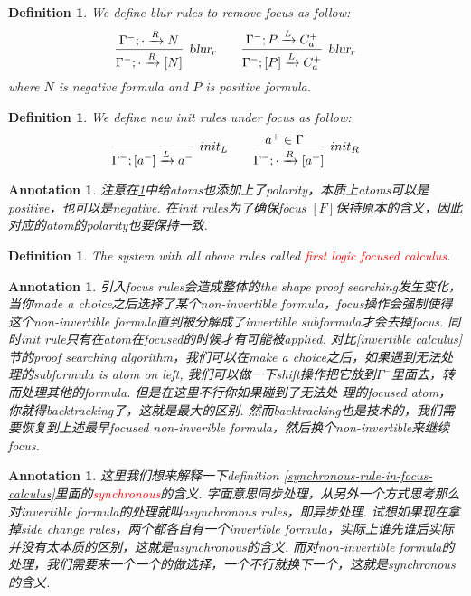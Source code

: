 \documentclass{article}
\theoremstyle{plain}
\newtheorem{definition}[theorem]{Definition}
\newtheorem{annotation}[theorem]{Annotation}
\theoremstyle{nonumberplain}
\newcommand{\redt}[1]{\textcolor{red}{#1}}
\begin{document}
\begin{definition}
\rm We define \textsl{blur} rules to remove focus as follow:
\[
\infer[\textsl{blur}_r]{\Gamma^-;\cdot \xrightarrow{R} [N]}{\Gamma^-;\cdot \xrightarrow{R} N} \quad\quad 
\infer[\textsl{blur}_r]{\Gamma^-;[P] \xrightarrow{L} C_a^+}{\Gamma^-; P \xrightarrow{L} C_a^+}
\]
where $N$ is negative formula and $P$ is positive formula.
\end{definition}

\begin{definition}\label{init-of-invertible-calculus}
\rm We define new \emph{init} rules under focus as follow: 
\[
\infer[init_L]{\Gamma^-;[a^-] \xrightarrow{L} a^-}{} \quad\quad
\infer[init_R]{\Gamma^-; \cdot \xrightarrow{R} [a^+]}{a^+ \in \Gamma^-}
\]
\end{definition}

\begin{annotation}
\rm 注意在\ref{init-of-invertible-calculus}中给atoms也添加上了polarity，本质上atoms可以是positive，也可以是negative. 在\emph{init} rules为了确保focus $[F]$保持原本的含义，因此对应的atom的polarity也要保持一致. 	
\end{annotation}


\begin{definition}
\rm The system with all above rules called \redt{first logic focused calculus}.
\end{definition}


\begin{annotation}
\rm 引入\textsl{focus} rules会造成整体的the shape proof searching发生变化，当你made a choice之后选择了某个non-invertible formula，focus操作会强制使得这个non-invertible formula直到被分解成了invertible subformula才会去掉focus. 同时\emph{init} rule只有在atom在focused的时候才有可能被applied. 对比\ref{invertible calculus}节的proof searching algorithm，我们可以在make a choice之后，如果遇到无法处理的subformula is atom on left, 我们可以做一下\textsl{shift}操作把它放到$\Gamma^-$里面去，转而处理其他的formula. 但是在这里不行你如果碰到了无法处
理的focused atom，你就得backtracking了，这就是最大的区别. 然而backtracking也是技术的，我们需要恢复到上述最早focused non-inverible formula，然后换个non-invertible来继续focus. 
\end{annotation}


\begin{annotation}
\rm 这里我们想来解释一下definition \ref{synchronous-rule-in-focus-calculus}里面的\redt{synchronous}的含义. 字面意思同步处理，从另外一个方式思考那么对invertible formula的处理就叫asynchronous rules，即异步处理. 试想如果现在拿掉side change rules，两个都各自有一个invertible formula，实际上谁先谁后实际并没有太本质的区别，这就是asynchronous的含义. 而对non-invertible formula的处理，我们需要来一个一个的做选择，一个不行就换下一个，这就是synchronous的含义. 
\end{annotation}
\end{document}

